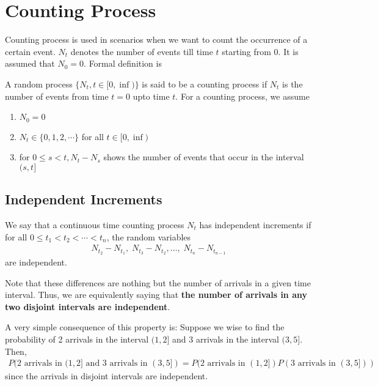 \documentclass[../../probability-notes.tex]{subfiles}
\begin{document}
    \section{Counting Process}
    Counting process is used in scenarios when we want to count the occurrence of a certain event. $N_{t}$ denotes the number of events till time $t$ starting from 0. It is assumed that $N_{0} = 0$. Formal definition is\newline

    A random process $\{N_{t}, t \in [0, \inf)\}$ is said to be a counting process if $N_{t}$ is the number of events from time $t=0$ upto time $t$. For a counting process, we assume
    \begin{enumerate}
        \item $N_{0} = 0$
        \item $N_{t} \in \{0, 1, 2, \cdots\}$ for all $t \in [0, \inf)$
        \item for $0 \leq s < t, N_{t} - N_{s} $ shows the number of events that occur in the interval $(s,t]$ 
    \end{enumerate}

    \subsection{Independent Increments}
    We say that a continuous time counting process $N_{t}$ has independent increments if for all $0 \leq t_{1} < t_{2} < \cdots < t_{n}$, the random variables
    \begin{align*}
         N_{t_{2}} - N_{t_{1}}, \;N_{t_{3}} - N_{t_{2}}, \ldots, \;N_{t_{n}} - N_{t_{n-1}}
    \end{align*}
    are independent.\newline

    Note that these differences are nothing but the number of arrivals in a given time interval. Thus, we are equivalently saying that \textbf{the number of arrivals in any two disjoint intervals are independent}.\newline

    A very simple consequence of this property is:\newline
    Suppose we wise to find the probability of 2 arrivals in the interval $(1,2]$ and 3 arrivals in the interval $(3,5]$. Then,
    \begin{align*}
        P(2 \text{ arrivals in } (1,2] \text{ and } 3 \text{ arrivals in } (3,5]) = P(2 \text{ arrivals in } (1,2]) P(3 \text{ arrivals in } (3,5]))
    \end{align*}
    since the arrivals in disjoint intervals are independent.
\end{document}
